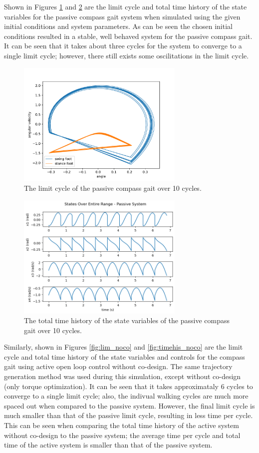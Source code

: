 \documentclass[smallextended]{./springer/svjour3}
\begin{document}
Shown in Figures \ref{fig:limcyc_passive} and \ref{fig:timehis_passive} are the limit cycle and total time history of the state variables for the passive compass gait system when simulated using the 
given initial conditions and system parameters. As can be seen the chosen initial conditions resulted in a stable, well behaved system for the passive compass gait. It can be 
seen that it takes about three cycles for the system to converge to a single limit cycle; however, there still exists some oscilitations in the limit cycle.

\begin{figure}[h]
\centering
\includegraphics[width=8cm]{./figures/limitcycle_passivesim.pdf}
\caption{The limit cycle of the passive compass gait over 10 cycles.}
\label{fig:limcyc_passive}
\end{figure}

\begin{figure}[h]
\centering
\includegraphics[width=8cm]{./figures/timehis_passivesim.png}
\caption{The total time history of the state variables of the passive compass gait over 10 cycles.}
\label{fig:timehis_passive}
\end{figure}

Similarly, shown in Figures \ref{fig:lim_noco} and \ref{fig:timehis_noco} are the limit cycle and total time history of the state variables and controls for the compass gait 
using active open loop control without co-design. The same trajectory generation method was used during this simulation, except without co-design (only torque optimization).
It can be seen that it takes approximataly 6 cycles to converge to a single limit cycle; also, the indivual walking cycles are much more spaced out when compared to the passive system.
However, the final limit cycle is much smaller than that of the passive limit cycle, resulting in less time per cycle. This can be seen when comparing the total time history of the 
active system without co-design to the passive system; the average time per cycle and total time of the active system is smaller than that of the passive system.
\end{document}
